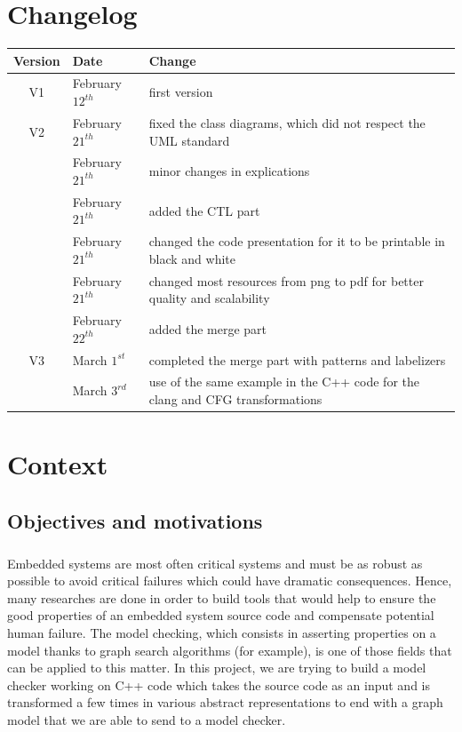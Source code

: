 \documentclass{report}
\begin{document}
\chapter*{Changelog}
\begin{center}
\begin{tabular}{|c|l|l|}
  \hline
  Version & Date & Change  \\
  \hline
  V1 & February $12^{th}$  & first version \\
  \hline
  V2 & February $21^{th}$  & fixed the class diagrams, which did not respect the UML standard \\
  & February $21^{th}$ & minor changes in explications \\
  & February $21^{th}$ & added the CTL part \\
  & February $21^{th}$ & changed the code presentation for it to be printable in black and white \\
  & February $21^{th}$ & changed most resources from png to pdf for better quality and scalability \\
  & February $22^{th}$ & added the merge part \\
  \hline
  V3 & March $1^{st}$ & completed the merge part with patterns and labelizers \\
  & March $3^{rd}$ & use of the same example in the C++ code for the clang and CFG transformations\\
 \hline
\end{tabular}
\end{center}
\chapter{Context}

\section{Objectives and motivations}

\paragraph{}
\hspace{4mm}Embedded systems are most often critical systems and must be as robust as possible to avoid critical failures which could have dramatic consequences.
Hence, many researches are done in order to build tools that would help to ensure the good properties of an embedded system source code and compensate potential human
failure. The model checking, which consists in asserting properties on a model thanks to graph search algorithms (for example), is one of those fields that can be
applied to this matter. In this project, we are trying to build a model checker working on C++ code which takes the source code as an input and is transformed a few times
in various abstract representations to end with a graph model that we are able to send to a model checker.
\end{document}

